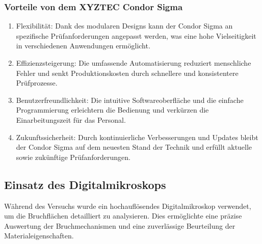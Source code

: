 \subsubsection{Vorteile von dem XYZTEC Condor Sigma}
\begin{enumerate}
    \item Flexibilität: Dank des modularen Designs kann der Condor Sigma an spezifische Prüfanforderungen angepasst werden, was eine hohe Vielseitigkeit in verschiedenen Anwendungen ermöglicht.
    \item Effizienzsteigerung: Die umfassende Automatisierung reduziert menschliche Fehler und senkt Produktionskosten durch schnellere und konsistentere Prüfprozesse.
    \item Benutzerfreundlichkeit: Die intuitive Softwareoberfläche und die einfache Programmierung erleichtern die Bedienung und verkürzen die Einarbeitungszeit für das Personal.
    \item Zukunftssicherheit: Durch kontinuierliche Verbesserungen und Updates bleibt der Condor Sigma auf dem neuesten Stand der Technik und erfüllt aktuelle sowie zukünftige Prüfanforderungen.
\end{enumerate}
\subsection{Einsatz des Digitalmikroskops}
Während des Versuchs wurde ein hochauflösendes Digitalmikroskop verwendet, um die Bruchflächen detailliert zu analysieren. Dies ermöglichte eine präzise Auswertung der Bruchmechanismen und eine zuverlässige Beurteilung der Materialeigenschaften.
